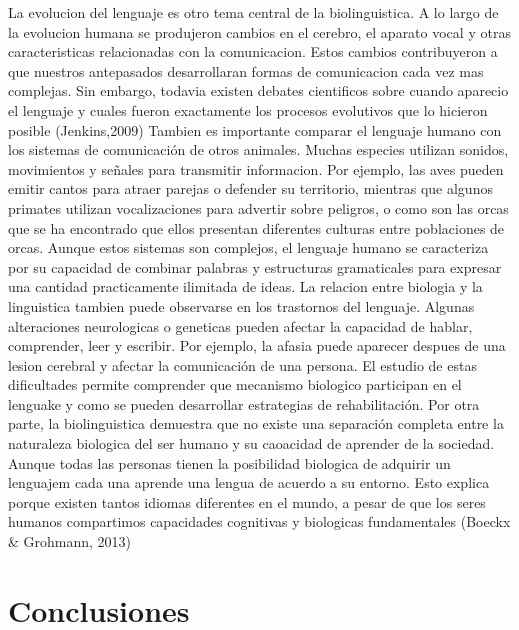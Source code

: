 \documentclass[12pt]{article}
\begin{document}
La evolucion del lenguaje es otro tema central de la biolinguistica. A lo largo de la evolucion humana se produjeron cambios en el cerebro, el aparato vocal y otras caracteristicas relacionadas con la comunicacion. Estos cambios contribuyeron a que nuestros antepasados desarrollaran formas de comunicacion cada vez mas complejas. Sin embargo, todavia existen debates cientificos sobre cuando aparecio el lenguaje y cuales fueron exactamente los procesos evolutivos que lo hicieron posible (Jenkins,2009)
Tambien es importante comparar el lenguaje humano con los sistemas de comunicación de otros animales. Muchas especies utilizan sonidos, movimientos y señales para transmitir informacion. Por ejemplo, las aves pueden emitir cantos para atraer parejas o defender su territorio, mientras que algunos primates utilizan vocalizaciones para advertir sobre peligros, o como son las orcas que se ha encontrado que ellos presentan diferentes culturas entre poblaciones de orcas. Aunque estos sistemas son complejos, el lenguaje humano se caracteriza por su capacidad de combinar palabras y estructuras gramaticales para expresar una cantidad practicamente ilimitada de ideas.
La relacion entre biologia y la linguistica tambien puede observarse en los trastornos del lenguaje. Algunas alteraciones neurologicas o geneticas pueden afectar la capacidad de hablar, comprender, leer y escribir. Por ejemplo, la afasia puede aparecer despues de una lesion cerebral y afectar la comunicación de una persona. El estudio de estas dificultades permite comprender que mecanismo biologico participan en el lenguake y como se pueden desarrollar estrategias de rehabilitación.
Por otra parte, la biolinguistica demuestra que no existe una separación completa entre la naturaleza biologica del ser humano y su caoacidad de aprender de la sociedad. Aunque todas las personas tienen la posibilidad biologica de adquirir un lenguajem cada una aprende una lengua de acuerdo a su entorno. Esto explica porque existen tantos idiomas diferentes en el mundo, a pesar de que los seres humanos compartimos capacidades cognitivas y biologicas fundamentales (Boeckx & Grohmann, 2013)



\section{Conclusiones}
\end{document}
